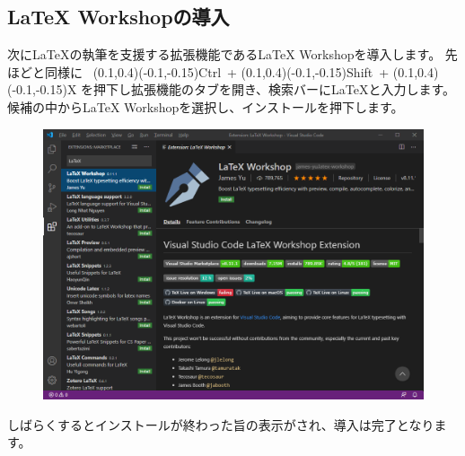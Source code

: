 		\subsection{LaTeX Workshopの導入}
			次に\LaTeX の執筆を支援する拡張機能であるLaTeX Workshopを導入します。
			先ほどと同様に~
			(0.1,0.4)(-0.1,-0.15)Ctrl~+
			(0.1,0.4)(-0.1,-0.15)Shift~+
			(0.1,0.4)(-0.1,-0.15)X
			を押下し拡張機能のタブを開き、検索バーにLaTeXと入力します。
			候補の中からLaTeX Workshopを選択し、インストールを押下します。
			\begin{figure}[H]
				\centering
				\includegraphics[width=120mm,trim=0 300 0 0,clip]{VSCode-latexworkshop.png}
			\end{figure}
			しばらくするとインストールが終わった旨の表示がされ、導入は完了となります。


